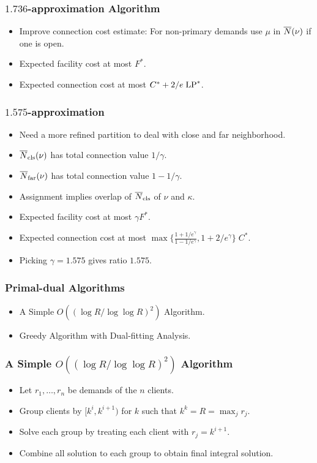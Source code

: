 \documentclass[hyperref, xcolor=dvipsnames]{beamer}
\begin{document}
\begin{frame}
  \frametitle{$1.736$-approximation Algorithm}
  \begin{itemize}
  \item Improve connection cost estimate: For non-primary demands use
    $\mu$ in ${\overline{N}}(\nu)$ if one is open.
  \item Expected facility cost at most $F^\ast$.
  \item Expected connection cost at most $C^\ast + 2/e\;\mbox{\rm LP}^\ast$.
  \end{itemize}
\end{frame}

\begin{frame}
  \frametitle{$1.575$-approximation}
  \begin{itemize}
  \item Need a more refined partition to deal with close and far
    neighborhood.
  \item ${\overline{N}}_{{\mbox{\scriptsize\rm cls}}}(\nu)$ has total connection value $1/\gamma$.
  \item ${\overline{N}}_{{\mbox{\scriptsize\rm far}}}(\nu)$ has total connection value $1-1/\gamma$.
  \item Assignment implies overlap of ${\overline{N}}_{{\mbox{\scriptsize\rm cls}}}$ of $\nu$ and
    $\kappa$.
  \item Expected facility cost at most $\gamma F^\ast$.
  \item Expected connection cost at most
    $\max\{\frac{1+1/e^\gamma}{1-1/e^\gamma}, 1+2/e^\gamma\}\; C^\ast$.
  \item Picking $\gamma=1.575$ gives ratio $1.575$.
  \end{itemize}
\end{frame}

\begin{frame}
  \frametitle{Primal-dual Algorithms}
  \begin{itemize}
  \item A Simple $O((\log R/\log\log R)^2)$ Algorithm.
  \item Greedy Algorithm with Dual-fitting Analysis.
  \end{itemize}
\end{frame}

\begin{frame}
  \frametitle{A Simple $O((\log R/\log\log R)^2)$ Algorithm}
  \begin{itemize}
  \item Let $r_1,\ldots, r_n$ be demands of the $n$ clients.
  \item Group clients by $[k^i, k^{i+1})$ for $k$ such that $k^k = R =
    \max_j r_j$.
  \item Solve each group by treating each client with
    $r_j=k^{i+1}$.
  \item Combine all solution to each group to obtain final integral
    solution.
  \end{itemize}
\end{frame}
\end{document}
